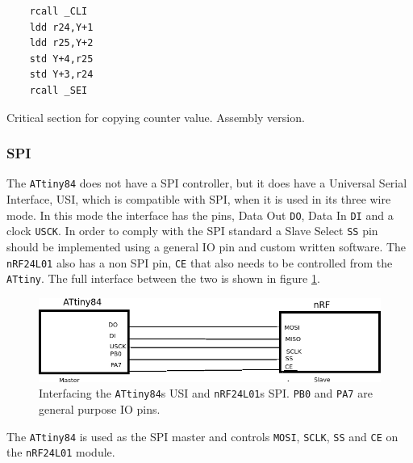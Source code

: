 {\renewcommand\fcolorbox[4][]{\textcolor{cyan}{\strut#4}}
\begin{listing}[h]
\begin{verbatim}
	rcall _CLI
	ldd r24,Y+1
	ldd r25,Y+2
	std Y+4,r25
	std Y+3,r24
	rcall _SEI
\end{verbatim}
\caption{Critical section for copying counter value. Assembly version.}
\label{code:critical_section_asm}
\end{listing}


\subsubsection{SPI} %
\label{ssub:spi}
The \texttt{ATtiny84} does not have a SPI controller, but it does have a Universal Serial Interface, USI, which is compatible with SPI, when it is used in its three wire mode.
In this mode the interface has the pins, Data Out \texttt{DO}, Data In \texttt{DI} and a clock \texttt{USCK}.
In order to comply with the SPI standard a Slave Select \texttt{SS} pin should be implemented using a general IO pin and custom written software.
The \texttt{nRF24L01} also has a non SPI pin, \texttt{CE} that also needs to be controlled from the \texttt{ATtiny}.
The full interface between the two is shown in figure \ref{fig:tiny_nrf_com}.

\begin{figure}[h]
	\centering
	\includegraphics[width=.35\linewidth]{graphics/tiny_nrf_com}
	\caption[Interface between ATtiny84 and nRF24L01.]{Interfacing the \texttt{ATtiny84}s USI and \texttt{nRF24L01}s SPI. \texttt{PB0} and \texttt{PA7} are general purpose IO pins.}
	\label{fig:tiny_nrf_com}
\end{figure}
The \texttt{ATtiny84} is used as the SPI master and controls \texttt{MOSI}, \texttt{SCLK}, \texttt{SS} and \texttt{CE} on the \texttt{nRF24L01} module.

}
